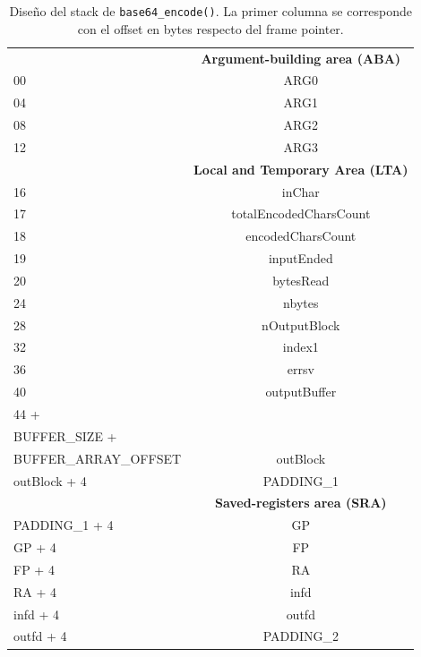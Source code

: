 \begin{table}[H]
	\centering
	\begin{tabular}{@{}l|c|@{}}
		\cmidrule(l){2-2} 
		\multicolumn{1}{c|}{\textbf{}} & \textbf{Argument-building area (ABA)} \\ \cmidrule(l){2-2} 
		00 & ARG0 \\ \cmidrule(l){2-2} 
		04 & ARG1 \\ \cmidrule(l){2-2} 
		08 & ARG2 \\ \cmidrule(l){2-2}
		12 & ARG3 \\ \cmidrule(l){2-2} 
		\multicolumn{1}{c|}{\textbf{}} & \textbf{Local and Temporary Area (LTA)} \\ \cmidrule(l){2-2} 
		16 & inChar \\ \cmidrule(l){2-2} 
		17 & totalEncodedCharsCount \\ \cmidrule(l){2-2} 
		18 & encodedCharsCount \\ \cmidrule(l){2-2} 
		19 & inputEnded \\ \cmidrule(l){2-2} 		
		20 & bytesRead \\ \cmidrule(l){2-2} 		
		24 & nbytes \\ \cmidrule(l){2-2} 		
		28 & nOutputBlock \\ \cmidrule(l){2-2} 		
		32 & index1 \\ \cmidrule(l){2-2} 				 
		36 & errsv \\ \cmidrule(l){2-2} 		
		40 & outputBuffer \\ \cmidrule(l){2-2} 		
		44 + \\BUFFER\_SIZE +\\ BUFFER\_ARRAY\_OFFSET & outBlock \\ \cmidrule(l){2-2} 		
		outBlock + 4 & PADDING\_1 \\ \cmidrule(l){2-2} 		
		\multicolumn{1}{c|}{\textbf{}} & \textbf{Saved-registers area (SRA)} \\ \cmidrule(l){2-2} 
		PADDING\_1 + 4 & GP \\ \cmidrule(l){2-2} 
		GP + 4 & FP \\ \cmidrule(l){2-2} 
		FP + 4 & RA \\ \cmidrule(l){2-2} 
		RA + 4 & infd \\ \cmidrule(l){2-2} 
		infd + 4 & outfd \\ \cmidrule(l){2-2} 
		outfd + 4 & PADDING\_2 \\ \cmidrule(l){2-2} 
	\end{tabular}
	\caption{Diseño del stack de \texttt{base64\_encode()}. La primer columna se corresponde con el offset en bytes respecto del frame pointer.}
	\label{stack_base64_encode}
\end{table}

